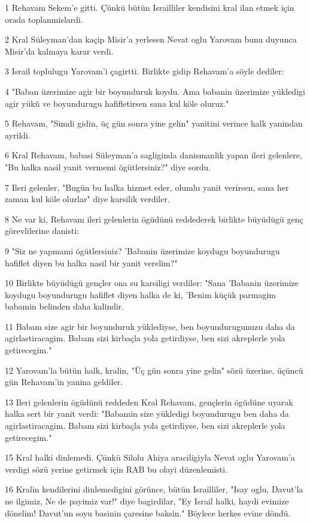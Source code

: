 \par 1 Rehavam Sekem'e gitti. Çünkü bütün Israilliler kendisini kral ilan etmek için orada toplanmislardi.
\par 2 Kral Süleyman'dan kaçip Misir'a yerlesen Nevat oglu Yarovam bunu duyunca Misir'da kalmaya karar verdi.
\par 3 Israil toplulugu Yarovam'i çagirtti. Birlikte gidip Rehavam'a söyle dediler:
\par 4 "Baban üzerimize agir bir boyunduruk koydu. Ama babanin üzerimize yükledigi agir yükü ve boyundurugu hafifletirsen sana kul köle oluruz."
\par 5 Rehavam, "Simdi gidin, üç gün sonra yine gelin" yanitini verince halk yanindan ayrildi.
\par 6 Kral Rehavam, babasi Süleyman'a sagliginda danismanlik yapan ileri gelenlere, "Bu halka nasil yanit vermemi ögütlersiniz?" diye sordu.
\par 7 Ileri gelenler, "Bugün bu halka hizmet eder, olumlu yanit verirsen, sana her zaman kul köle olurlar" diye karsilik verdiler.
\par 8 Ne var ki, Rehavam ileri gelenlerin ögüdünü reddederek birlikte büyüdügü genç görevlilerine danisti:
\par 9 "Siz ne yapmami ögütlersiniz? 'Babanin üzerimize koydugu boyundurugu hafiflet diyen bu halka nasil bir yanit verelim?"
\par 10 Birlikte büyüdügü gençler ona su karsiligi verdiler: "Sana 'Babanin üzerimize koydugu boyundurugu hafiflet diyen halka de ki, 'Benim küçük parmagim babamin belinden daha kalindir.
\par 11 Babam size agir bir boyunduruk yüklediyse, ben boyundurugunuzu daha da agirlastiracagim. Babam sizi kirbaçla yola getirdiyse, ben sizi akreplerle yola getirecegim."
\par 12 Yarovam'la bütün halk, kralin, "Üç gün sonra yine gelin" sözü üzerine, üçüncü gün Rehavam'in yanina geldiler.
\par 13 Ileri gelenlerin ögüdünü reddeden Kral Rehavam, gençlerin ögüdüne uyarak halka sert bir yanit verdi: "Babamin size yükledigi boyundurugu ben daha da agirlastiracagim. Babam sizi kirbaçla yola getirdiyse, ben sizi akreplerle yola getirecegim."
\par 15 Kral halki dinlemedi. Çünkü Silolu Ahiya araciligiyla Nevat oglu Yarovam'a verdigi sözü yerine getirmek için RAB bu olayi düzenlemisti.
\par 16 Kralin kendilerini dinlemedigini görünce, bütün Israilliler, "Isay oglu, Davut'la ne ilgimiz, Ne de payimiz var!" diye bagirdilar, "Ey Israil halki, haydi evimize dönelim! Davut'un soyu basinin çaresine baksin." Böylece herkes evine döndü.
